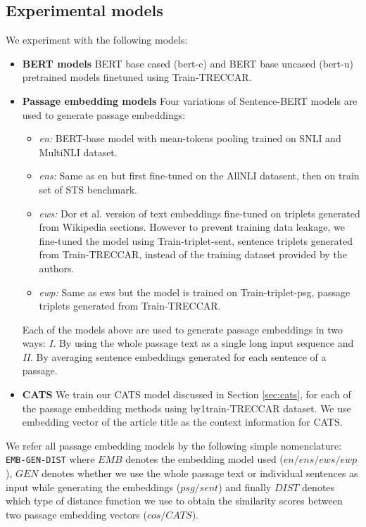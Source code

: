 \documentclass[sigconf,authordraft]{acmart}
\begin{document}
\subsection{Experimental models} We experiment with the following models:
\begin{itemize}
    \item \textbf{BERT models} BERT base cased (bert-c) and BERT base uncased (bert-u) pretrained models finetuned using Train-TRECCAR.
    \item \textbf{Passage embedding models} Four variations of Sentence-BERT models are used to generate passage embeddings: 
    \begin{itemize}
        \item \textit{en:} BERT-base model with mean-tokens pooling trained on SNLI and MultiNLI dataset.
        \item \textit{ens:} Same as en but first fine-tuned on the AllNLI datasent, then on train set of STS benchmark.
        \item \textit{ews:} Dor et al. version of text embeddings fine-tuned on triplets generated from Wikipedia sections. However to prevent training data leakage, we fine-tuned the model using Train-triplet-sent, sentence triplets generated from Train-TRECCAR, instead of the training dataset provided by the authors.
        \item \textit{ewp:} Same as ews but the model is trained on Train-triplet-psg,  passage triplets generated from Train-TRECCAR.
    \end{itemize}
    Each of the models above are used to generate passage embeddings in two ways: \textit{I. } By using the whole passage text as a single long input sequence and \textit{II. } By averaging sentence embeddings generated for each sentence of a passage. 
    \item \textbf{CATS} We train our CATS model discussed in Section \ref{sec:cats}, for each of the passage embedding methods using by1train-TRECCAR dataset. We use embedding vector of the article title as the context information for CATS.
\end{itemize}

We refer all passage embedding models by the following simple nomenclature: \texttt{EMB-GEN-DIST} where $EMB$ denotes the embedding model used ($en/ens/ews/ewp$), $GEN$ denotes whether we use the whole passage text or individual sentences as input while generating the embeddings ($psg/sent$) and finally $DIST$ denotes which type of distance function we use to obtain the similarity scores between two passage embedding vectors ($cos/CATS$).
\end{document}

